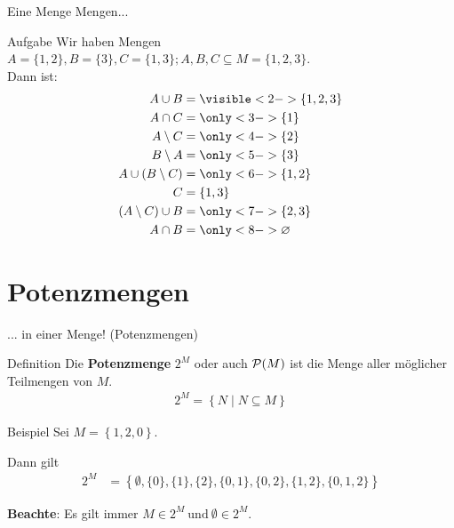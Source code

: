 \begin{frame}{Eine Menge Mengen...}
	\begin{block}{Aufgabe}
		Wir haben Mengen $A = \{1, 2\}, B = \{3\}, C = \{1, 3\}; A,B,C \subseteq M = \{1, 2, 3\}$.\\
		Dann ist:
		\begin{align*}
		A \cup B &= \visible<2->{ \{1, 2, 3\} }  \\
		A \cap C &= \only<3->{ \{1\} }\\
		A \setminus C &= \only<4->{ \{2\} }\\
		B \setminus A &= \only<5->{ \{3\} }\\
		A \cup (B \setminus C) &= \only<6->{ \{1, 2\} }\\
		C &= \{1, 3\} \\
		(A \setminus C) \cup B &= \only<7->{ \{2, 3\} }\\
		A \cap B &= \only<8->{ \emptyset }
		\end{align*}
	\end{block}
\end{frame}



\section{Potenzmengen}

\begin{frame}{... in einer Menge! (Potenzmengen)}
	\begin{block}{Definition}
		Die \textbf{Potenzmenge} $2^M$ oder auch $\mathcal{P} (M)$ ist die Menge aller möglicher Teilmengen von $M$. 
		\begin{align*}
			2^M = \left\{ N \mid N \subseteq M \right\}
		\end{align*}
	\end{block}
	\pause
	
	\begin{block}{Beispiel}
		Sei $M = \left\{ 1,2,0 \right\} $. \\ \pause
		
		Dann gilt  
		\begin{align*}   
		2^M &= \left\{ \emptyset, \{ 0 \}, \{ 1 \}, \{ 2 \}, \{ 0,1 \} , \{ 0,2 \}, \{ 1,2 \}, \{ 0,1,2 \} \right\}
		\end{align*}
		
		\textbf{Beachte}: Es gilt immer $M \in 2^M \ \text{und} \ \emptyset \in 2^M$.
	\end{block}
	
\end{frame}

